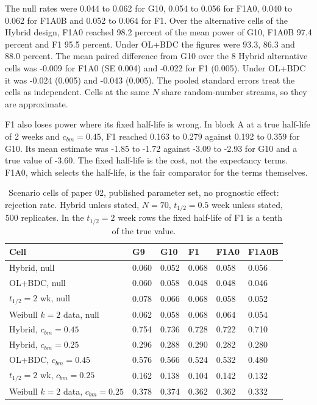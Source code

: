 \documentclass[
  11pt,
]{article}
\begin{document}
The null rates were 0.044 to 0.062 for G10, 0.054 to 0.056
for F1A0, 0.040 to 0.062 for F1A0B and 0.052 to 0.064 for F1.
Over the alternative cells of the Hybrid design, F1A0 reached
98.2 percent of the mean power of G10, F1A0B
97.4 percent and F1 95.5
percent. Under OL+BDC the figures were 93.3,
86.3 and 88.0 percent. The mean
paired difference from G10 over the 8 Hybrid alternative
cells was -0.009 for F1A0 (SE
0.004) and -0.022 for F1
(0.005). Under OL+BDC it was
-0.024 (0.005) and
-0.043 (0.005). The pooled
standard errors treat the cells as independent. Cells at the same
\(N\) share random-number streams, so they are approximate.

F1 also loses power where its fixed half-life is wrong. In block A
at a true half-life of 2 weeks and \(c_{bm} = 0.45\), F1 reached
0.163 to 0.279 against 0.192 to 0.359 for G10. Its mean estimate
was -1.85 to -1.72 against -3.09 to -2.93 for G10 and a true
value of -3.60. The fixed half-life is the cost, not the
expectancy terms. F1A0, which selects the half-life, is the fair
comparator for the terms themselves.

\begin{table}
\centering
\caption{\label{tab:tab-scen}Scenario cells of paper 02, published parameter
      set, no prognostic effect: rejection rate. Hybrid unless
      stated, $N = 70$, $t_{1/2} = 0.5$ week unless stated, 500
      replicates. In the $t_{1/2} = 2$ week rows the fixed half-life
      of F1 is a tenth of the true value.}
\centering
\fontsize{9}{11}\selectfont
\begin{tabular}[t]{llllll}
\toprule
Cell & G9 & G10 & F1 & F1A0 & F1A0B\\
\midrule
Hybrid, null & 0.060 & 0.052 & 0.068 & 0.058 & 0.056\\
OL+BDC, null & 0.060 & 0.058 & 0.048 & 0.048 & 0.046\\
$t_{1/2} = 2$ wk, null & 0.078 & 0.066 & 0.068 & 0.058 & 0.052\\
Weibull $k = 2$ data, null & 0.062 & 0.058 & 0.068 & 0.064 & 0.054\\
Hybrid, $c_{bm} = 0.45$ & 0.754 & 0.736 & 0.728 & 0.722 & 0.710\\
Hybrid, $c_{bm} = 0.25$ & 0.296 & 0.288 & 0.290 & 0.282 & 0.280\\
OL+BDC, $c_{bm} = 0.45$ & 0.576 & 0.566 & 0.524 & 0.532 & 0.480\\
$t_{1/2} = 2$ wk, $c_{bm} = 0.25$ & 0.162 & 0.138 & 0.104 & 0.142 & 0.132\\
Weibull $k = 2$ data, $c_{bm} = 0.25$ & 0.378 & 0.374 & 0.362 & 0.362 & 0.332\\
\bottomrule
\end{tabular}
\end{table}
\end{document}
